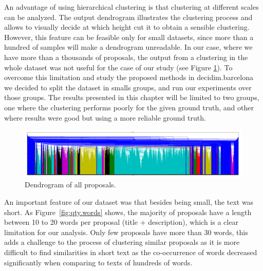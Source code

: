 An advantage of using hierarchical clustering is that clustering at different scales can be analyzed. The output dendrogram illustrates the clustering process and allows to visually decide at which height cut it to obtain a sensible clustering. However, this feature can be feasible only for small datasets, since more than a hundred of samples will make a dendrogram unreadable. In our case, where we have more than a thousands of proposals, the output from a clustering in the whole dataset was not useful for the case of our study (see Figure \ref{fig:dendro.all}). To overcome this limitation and study the proposed methods in decidim.barcelona we decided to split the dataset in smalls groups, and run our experiments over those groups. The results presented in this chapter will be limited to two groups, one where the clustering performs poorly for the given ground truth, and other where results were good but using a more reliable ground truth.

\begin{figure}[!htpb]
\centering
\includegraphics[width=16cm]{Figures/DendrogramAllDataset.png}
\caption{Dendrogram of all proposals.}
\label{fig:dendro.all}
\hfill
\end{figure}

An important feature of our dataset was that besides being small, the text was short. As Figure~\ref{fig:qty.words} shows, the majority of proposals have a length between 10 to 20 words per proposal (title + description), which is a clear limitation for our analysis.
Only few proposals have more than 30 words, this adds a challenge to the process of clustering similar proposals as it is more difficult to find similarities in short text as the co-occurrence of words decreased significantly when comparing to texts of hundreds of words. 

